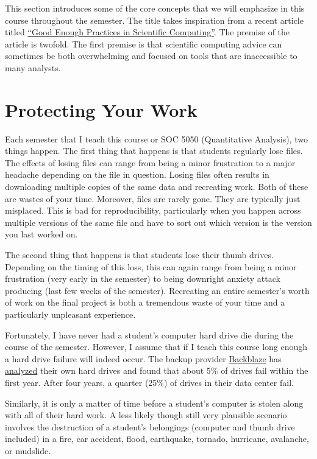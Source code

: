 \documentclass[]{book}
\begin{document}
This section introduces some of the core concepts that we will emphasize
in this course throughout the semester. The title takes inspiration from
a recent article titled \href{https://arxiv.org/abs/1609.00037}{``Good
Enough Practices in Scientific Computing''}. The premise of the article
is twofold. The first premise is that scientific computing advice can
sometimes be both overwhelming and focused on tools that are
inaccessible to many analysts.

\chapter{Protecting Your Work}\label{protecting-your-work}

Each semester that I teach this course or SOC 5050 (Quantitative
Analysis), two things happen. The first thing that happens is that
students regularly lose files. The effects of losing files can range
from being a minor frustration to a major headache depending on the file
in question. Losing files often results in downloading multiple copies
of the same data and recreating work. Both of these are wastes of your
time. Moreover, files are rarely gone. They are typically just
misplaced. This is bad for reproducibility, particularly when you happen
across multiple versions of the same file and have to sort out which
version is the version you last worked on.

The second thing that happens is that students lose their thumb drives.
Depending on the timing of this loss, this can again range from being a
minor frustration (very early in the semester) to being downright
anxiety attack producing (last few weeks of the semester). Recreating an
entire semester's worth of work on the final project is both a
tremendous waste of your time and a particularly unpleasant experience.

Fortunately, I have never had a student's computer hard drive die during
the course of the semester. However, I assume that if I teach this
course long enough a hard drive failure will indeed occur. The backup
provider \href{https://www.backblaze.com/}{Backblaze} has
\href{https://www.backblaze.com/blog/how-long-do-disk-drives-last/}{analyzed}
their own hard drives and found that about 5\% of drives fail within the
first year. After four years, a quarter (25\%) of drives in their data
center fail.

Similarly, it is only a matter of time before a student's computer is
stolen along with all of their hard work. A less likely though still
very plausible scenario involves the destruction of a student's
belongings (computer and thumb drive included) in a fire, car accident,
flood, earthquake, tornado, hurricane, avalanche, or mudslide.
\end{document}
